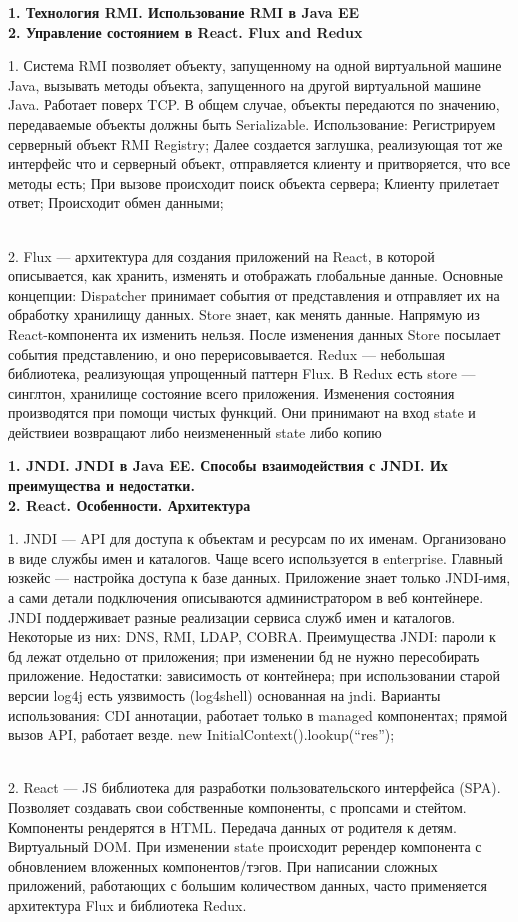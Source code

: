 \documentclass{article}
\newcommand{\bil}[4]{%
    \begin{minipage}{.3\textwidth}
        \textbf{1. #1} \\
        \textbf{2. #2}

        1. #3
        \\
        2. #4
    \end{minipage}
}
\begin{document}
\hfill
\bil{Технология RMI. Использование RMI в Java EE}{Управление состоянием в React. Flux and Redux}{
    Система RMI позволяет объекту, запущенному на одной виртуальной машине Java, вызывать методы объекта, запущенного на другой виртуальной машине Java. Работает поверх TCP. В общем случае, объекты передаются по значению, передаваемые объекты должны быть Serializable.
    Использование: Регистрируем серверный объект RMI Registry; Далее создается заглушка, реализующая тот же интерфейс что и серверный объект, отправляется клиенту и притворяется, что все методы есть;
При вызове происходит поиск объекта сервера;
Клиенту прилетает ответ;
Происходит обмен данными;
}{
    Flux — архитектура для создания приложений на React, в которой описывается, как хранить, изменять и отображать глобальные данные.
Основные концепции: Dispatcher принимает события от представления и отправляет их на обработку хранилищу данных. Store знает, как менять данные. Напрямую из React-компонента их изменить нельзя. После изменения данных Store посылает события представлению, и оно перерисовывается.
Redux — небольшая библиотека, реализующая упрощенный паттерн Flux. В Redux есть store — синглтон, хранилище состояние всего приложения. Изменения состояния производятся при помощи чистых функций. Они принимают на вход state и действиеи возвращают либо неизмененный state либо копию
}
\hfill
\bil{JNDI. JNDI в Java EE. Способы взаимодействия с JNDI. Их преимущества и недостатки.}{React. Особенности. Архитектура}{
    JNDI — API для доступа к объектам и ресурсам по их именам. Организовано в виде службы имен и каталогов.
    Чаще всего используется в enterprise. Главный юзкейс — настройка доступа к базе данных. Приложение знает только JNDI-имя, а сами детали подключения описываются администратором в веб контейнере.
    JNDI поддерживает разные реализации сервиса служб имен и каталогов. Некоторые из них: DNS, RMI, LDAP, COBRA. 
    Преимущества JNDI: пароли к бд лежат отдельно от приложения; при изменении бд не нужно пересобирать приложение.
    Недостатки: зависимость от контейнера; при использовании старой версии log4j есть уязвимость (log4shell) основанная на jndi.
    Варианты использования: CDI аннотации, работает только в managed компонентах; прямой вызов API, работает везде. new InitialContext().lookup(“res”);
}{
    React — JS библиотека для разработки пользовательского интерфейса (SPA). Позволяет создавать свои собственные компоненты, с пропсами и стейтом. Компоненты рендерятся в HTML.
    Передача данных от родителя к детям. Виртуальный DOM. При изменении state происходит ререндер компонента с обновлением вложенных компонентов/тэгов.
    При написании сложных приложений, работающих с большим количеством данных, часто применяется архитектура Flux и библиотека Redux.
}
\end{document}
